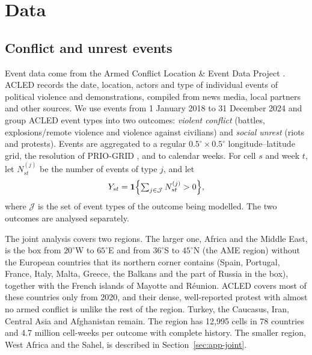 \section{Data}\label{sec:data}

\subsection{Conflict and unrest events}\label{sec:data-acled}

Event data come from the Armed Conflict Location \& Event Data Project
\citep[ACLED;][]{raleigh2010acled}. ACLED records the date, location, actors and type
of individual events of political violence and demonstrations, compiled from news
media, local partners and other sources. We use events from 1 January 2018 to
31 December 2024 and group ACLED event types into two outcomes:
\emph{violent conflict} (battles, explosions/remote violence and violence against
civilians) and \emph{social unrest} (riots and protests). Events are aggregated to a
regular $0.5^\circ \times 0.5^\circ$ longitude--latitude grid, the resolution of
PRIO-GRID \citep{tollefsen2012priogrid}, and to calendar weeks. For cell $s$ and week
$t$, let $N^{(j)}_{st}$ be the number of events of type $j$, and let
\[
Y_{st} = \mathbf{1}\Bigl\{\textstyle\sum_{j \in \mathcal{J}} N^{(j)}_{st} > 0\Bigr\},
\]
where $\mathcal{J}$ is the set of event types of the outcome being modelled. The two
outcomes are analysed separately.

The joint analysis covers two regions. The larger one, Africa and the Middle East, is
the box from $20^\circ$W to $65^\circ$E and from $36^\circ$S to $45^\circ$N (the AME
region) without the
European countries that its northern corner contains (Spain, Portugal, France, Italy,
Malta, Greece, the Balkans and the part of Russia in the box), together with the
French islands of Mayotte and R\'eunion. ACLED covers most of these countries only
from 2020, and their dense, well-reported protest with almost no armed conflict is
unlike the rest of the region. Turkey, the Caucasus, Iran, Central Asia and
Afghanistan remain. The region has 12{,}995 cells in 78 countries and 4.7 million
cell-weeks per outcome with complete history. The smaller region, West Africa and the Sahel, is described in
Section~\ref{sec:app-joint}.

